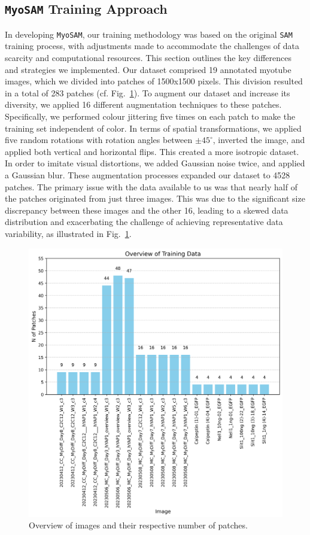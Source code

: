 \subsection{\texttt{MyoSAM} Training Approach}
In developing \texttt{MyoSAM}, our training methodology was based on the original \texttt{SAM} training process, with adjustments made to accommodate the challenges of data scarcity and computational resources. This section outlines the key differences and strategies we implemented.
Our dataset comprised 19 annotated myotube images, which we divided into patches of 1500x1500 pixels. This division resulted in a total of 283 patches (cf. Fig.~\ref{figtraindata}). To augment our dataset and increase its diversity, we applied 16 different augmentation techniques to these patches. Specifically, we performed colour jittering five times on each patch to make the training set independent of color. In terms of spatial transformations, we applied five random rotations with rotation angles between $\pm 45^{\circ}$, inverted the image, and applied both vertical and horizontal flips. This created a more isotropic dataset. In order to imitate visual distortions, we added Gaussian noise twice, and applied a Gaussian blur. These augmentation processes expanded our dataset to 4528 patches. The primary issue with the data available to us was that nearly half of the patches originated from just three images. This was due to the significant size discrepancy between these images and the other 16, leading to a skewed data distribution and exacerbating the challenge of achieving representative data variability, as illustrated in Fig.~\ref{figtraindata}.

\begin{figure}
	\centering
	\includegraphics[width=\textwidth]{"images/overview_training_data.png"}
	\caption[Patches per image]{Overview of images and their respective number of patches.}
	\label{figtraindata}
\end{figure}


